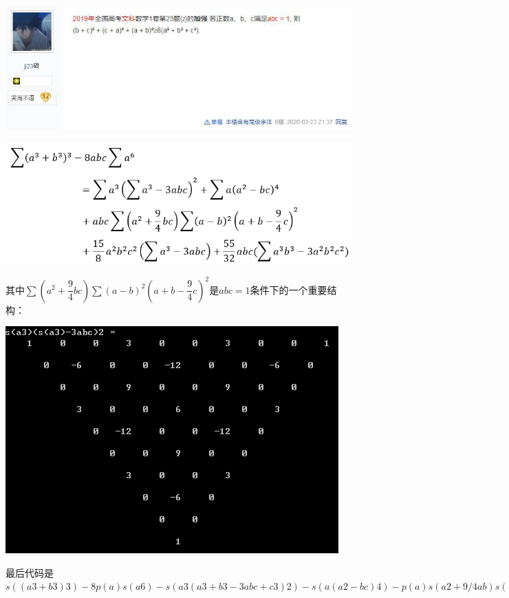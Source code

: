 \documentclass[UTF8]{ctexart}
\begin{document}
\subsection{}
\begin{center}
	\includegraphics[width=0.8\linewidth]{a22}
\end{center}
\begin{center}
	\includegraphics[width=0.8\linewidth]{a23}
\end{center}
其中$ \sum(a^{2}+\dfrac{9}{4} b c) \sum(a-b)^{2}(a+b-\dfrac{9}{4} c)^{2} $是$ abc=1 $条件下的一个重要结构：
\begin{center}
	\includegraphics[width=0.7\linewidth]{a230}
\end{center}
最后代码是
$ s((a3+b3)3)-8p(a)s(a6)-s(a3(a3+b3-3abc+c3)2)-s(a(a2-bc)4)-p(a)s(a2+9/4ab)s((a-b)2(a+b-9/4c)2)-15/8p(a2)(s(a3)-3abc)-55/32abc(s(a3b3)-3p(a2)) $
\end{document}
